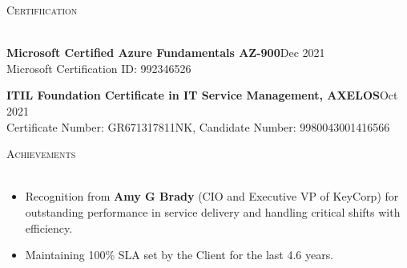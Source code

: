 \documentclass[a4paper]{article}
\newcommand{\lineunder} {
    \vspace*{-8pt} \\
    \hspace*{-18pt} \hrulefill \\
}
\newcommand{\header} [1] {
    {\hspace*{-18pt}\vspace*{6pt} \textsc{#1}}
    \vspace*{-6pt} \lineunder
}
\begin{document}
{\color{blue}\header{Certifiication}}
\vspace{1mm}
\item \textbf{Microsoft Certified Azure Fundamentals AZ-900}\hfill Dec 2021\\
Microsoft Certification ID: 992346526\\
\item \textbf{ITIL Foundation Certificate in IT Service Management, AXELOS}\hfill Oct 2021\\
Certificate Number: GR671317811NK, Candidate Number: 9980043001416566\\
\vspace{2mm}

{\color{blue}\header{Achievements}}
\vspace{1mm}
\justify
\begin{itemize} \itemsep 1pt
           \item Recognition from \textbf{Amy G Brady} (CIO and Executive VP of KeyCorp) for outstanding performance in service delivery and handling critical shifts with efficiency. \\
           \item Maintaining 100\%  SLA set by the Client for the last 4.6 years.
\end{itemize}
\vspace{2mm}
\end{document}
